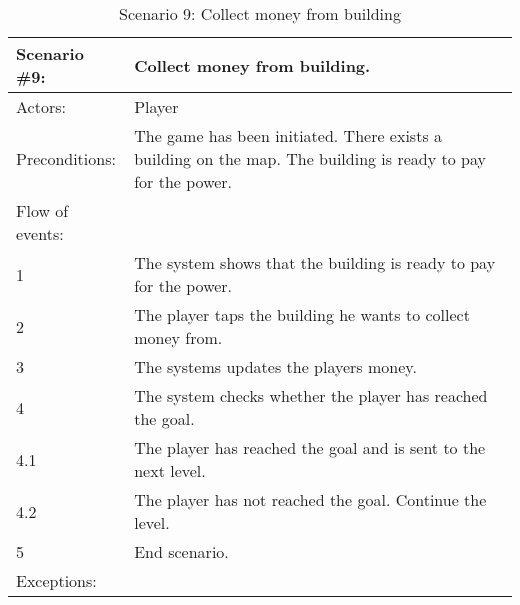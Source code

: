 \begin{table}
	\begin{tabular}{| l | p{10cm} |}
		\hline
		\rowcolor{lightgray}
		{\bf Scenario \#9:} & {\bf Collect money from building.} \\ \hline
		Actors: & Player \\ \hline
		Preconditions: & The game has been initiated. There exists a building on the map. The building is ready to pay for the power. \\ \hline
		\rowcolor{lightergray}
		Flow of events: & \\ \hline
		1 & The system shows that the building is ready to pay for the power. \\ \hline
		2 & The player taps the building he wants to collect money from. \\ \hline
		3 & The systems updates the players money. \\ \hline
		4 & The system checks whether the player has reached the goal. \\ \hline
		4.1 & The player has reached the goal and is sent to the next level. \\ \hline
		4.2 & The player has not reached the goal. Continue the level. \\ \hline
		5 & End scenario. \\ \hline
		\rowcolor{lightergray}
		Exceptions: & \\ \hline
	\end{tabular}
\caption{Scenario 9: Collect money from building}
\end{table}
